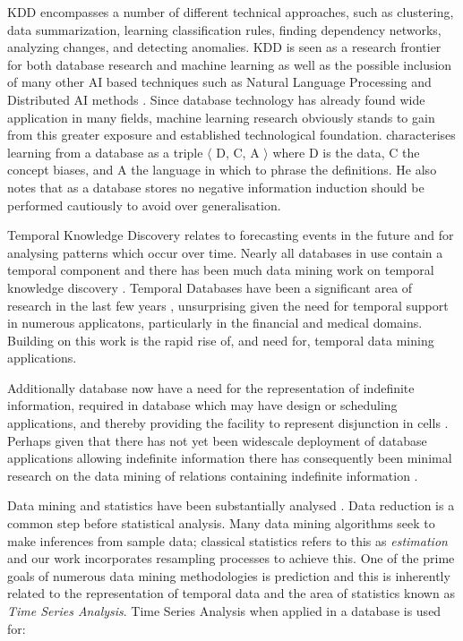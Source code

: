 KDD encompasses a number of different
technical approaches, such as clustering, data summarization, learning
classification rules, finding dependency networks, analyzing changes,
and detecting anomalies.  
KDD is seen as a research frontier for both database research and
machine learning as well as the 
possible inclusion of many other AI based techniques such as Natural Language 
Processing and Distributed AI methods \cite{kdd96}.  Since database 
technology has already found  
wide application in many fields, machine learning research obviously
stands to gain from this greater exposure and established
technological foundation. \cite{xiao95} characterises learning from a
database as a triple $\langle$ D, C, A $\rangle$ where 
D is the data, C the concept biases, and A the language in which to
phrase the definitions. He also notes that as a database stores no  
negative information induction should be performed cautiously to avoid
over generalisation.

\medskip

Temporal Knowledge Discovery relates to forecasting events in the future and for analysing
patterns which occur over time. Nearly all databases in use contain a
temporal component and there has been much data mining work on
temporal knowledge discovery \cite{alss95,pt96,bc96,bt98}. Temporal
Databases have been a significant area of research in the last few
years \cite{tcg93,ct95}, unsurprising given the need for temporal
support in numerous applicatons, particularly in the financial and
medical domains. Building on this work is the rapid rise of, and need
for, temporal data mining applications.  

\medskip

Additionally database now have a need for the representation of
indefinite information, required in database which may have design or
scheduling applications, and thereby providing the facility to
represent disjunction in cells \cite{il84,inv91,ivv95,vn95}.  Perhaps
given that there has not yet been widescale deployment of database
applications allowing indefinite information there has consequently
been minimal research on the data mining of relations containing
indefinite information \cite{cl98b}.

\medskip

Data mining and statistics have been substantially analysed
\cite{fhs96,gmp97}. Data reduction is a common step before statistical
analysis. Many data mining algorithms seek to make inferences from
sample data; classical statistics refers to this as {\em estimation}
and our work incorporates resampling processes \cite{efro79,et86,et93}
to achieve this. One of the prime goals of numerous data mining
methodologies is prediction and this is inherently related to the
representation of temporal data and the area of statistics known as
{\em Time Series Analysis}. Time Series Analysis when applied in a
 database is used for:

